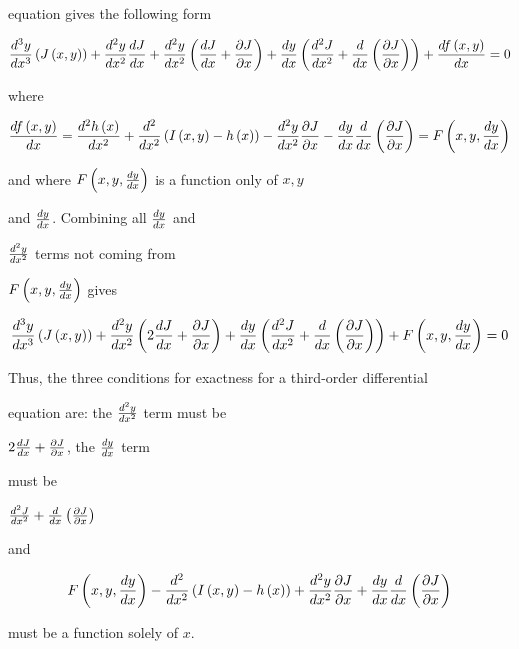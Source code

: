 equation gives the following form



$${d^3y \over dx^3}\left(J\left(x,y\right)\right)+{d^2y \over dx^2}{dJ \over dx}+{d^2y \over dx^2}\left({dJ \over dx}+{\partial J\over\partial x}\right)+{dy \over dx}\left({d^2J \over dx^2}+{d \over dx}\left({\partial J\over\partial x}\right)\right)+{df\left(x,y\right) \over dx}=0$$



where



$${df\left(x,y\right) \over dx}={d^2h\left(x\right) \over dx^2}+{d^2 \over dx^2}\left(I\left(x,y\right)-h\left(x\right)\right)-{d^2y \over dx^2}{\partial J\over\partial x}-{dy \over dx}{d \over dx}\left({\partial J\over\partial x}\right)=F\left(x,y,{dy \over dx}\right)$$

and where $F\left(x,y,{dy \over dx}\right)$ is a function only of $x,y$

and ${dy \over dx}$. Combining all ${dy \over dx}$ and

${d^2y \over dx^2}$ terms not coming from

$F\left(x,y,{dy \over dx}\right)$ gives



$${d^3y \over dx^3}\left(J\left(x,y\right)\right)+{d^2y \over dx^2}\left(2{dJ \over dx}+{\partial J\over\partial x}\right)+{dy \over dx}\left({d^2J \over dx^2}+{d \over dx}\left({\partial J\over\partial x}\right)\right)+F\left(x,y,{dy \over dx}\right)=0$$



Thus, the three conditions for exactness for a third-order differential

equation are: the ${d^2y \over dx^2}$ term must be

$2{dJ \over dx}+{\partial J\over\partial x}$, the ${dy \over dx}$ term

must be

${d^2J \over dx^2}+{d \over dx}\left({\partial J\over\partial x}\right)$

and



$$F\left(x,y,{dy \over dx}\right)-{d^2 \over dx^2}\left(I\left(x,y\right)-h\left(x\right)\right)+{d^2y \over dx^2}{\partial J\over\partial x}+{dy \over dx}{d \over dx}\left({\partial J\over\partial x}\right)$$



must be a function solely of $x$.



